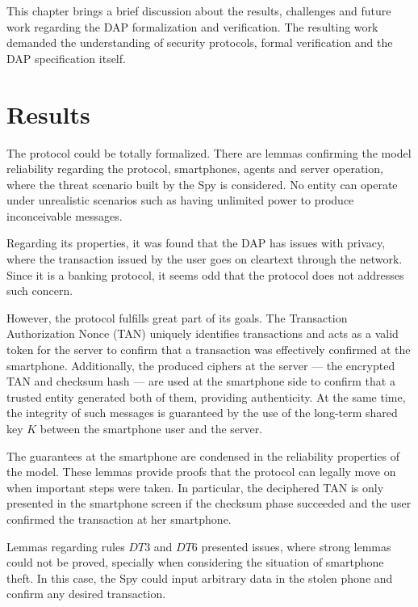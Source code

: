 \label{chap:conclusion}
This chapter brings a brief discussion about the results, challenges and future work regarding the DAP formalization and verification. The resulting work demanded the understanding of security protocols, formal verification and the DAP specification itself.


\section{Results}
The protocol could be totally formalized. There are lemmas confirming the model reliability regarding the protocol, smartphones, agents and server operation, where the threat scenario built by the Spy is considered. No entity can operate under unrealistic scenarios such as having unlimited power to produce inconceivable messages.

Regarding its properties, it was found that the DAP has issues with privacy, where the transaction issued by the user goes on cleartext through the network. Since it is a banking protocol, it seems odd that the protocol does not addresses such concern.

However, the protocol fulfills great part of its goals. The Transaction Authorization Nonce (TAN) uniquely identifies transactions and acts as a valid token for the server to confirm that a transaction was effectively confirmed at the smartphone. Additionally, the produced ciphers at the server --- the encrypted TAN and checksum hash --- are used at the smartphone side to confirm that a trusted entity generated both of them, providing authenticity. At the same time, the integrity of such messages is guaranteed by the use of the long-term shared key \(K\) between the smartphone user and the server.

The guarantees at the smartphone are condensed in the reliability properties of the model. These lemmas provide proofs that the protocol can legally move on when important steps were taken. In particular, the deciphered TAN is only presented in the smartphone screen if the checksum phase succeeded and the user confirmed the transaction at her smartphone.

Lemmas regarding rules $DT3$ and $DT6$ presented issues, where strong lemmas could not be proved, specially when considering the situation of smartphone theft. In this case, the Spy could input arbitrary data in the stolen phone and confirm any desired transaction.


